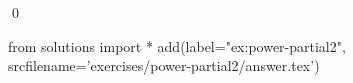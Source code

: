 
\begin{ex} 
  \label{ex:power-partial2}
  
  \qed
\end{ex} 
\begin{python0}
from solutions import *
add(label="ex:power-partial2",
    srcfilename='exercises/power-partial2/answer.tex') 
\end{python0}
